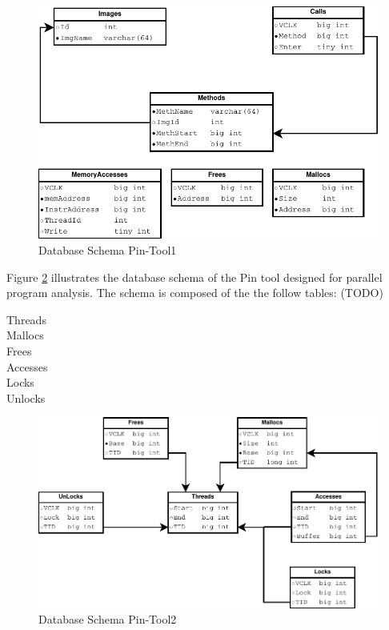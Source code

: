 \begin{figure}
  \includegraphics[width=\columnwidth]{database_schema1}
  \caption{Database Schema Pin-Tool1}
  \label{pic:db_schema1}
\end{figure}


Figure \ref{pic:db_schema2} illustrates the database
schema of the Pin tool designed for parallel program analysis.
The schema is composed of the the follow tables: (TODO)
\begin{description}
  \item[Threads]
  \item[Mallocs]
  \item[Frees]
  \item[Accesses]
  \item[Locks]
  \item[Unlocks]
\end{description}

\begin{figure}
  \includegraphics[width=\columnwidth]{database_schema2}
  \caption{Database Schema Pin-Tool2}
  \label{pic:db_schema2}
\end{figure}


